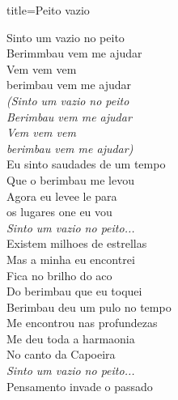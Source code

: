 \documentclass[fontsize=14pt, paper=a4, twoside, DIV=20]{scrreprt} %
\begin{document}
\begin{multicols*}{2}
\begin{song}{title={Peito vazio}}
        \begin{verse*}
            Sinto um vazio no peito\\
            Berimmbau vem me ajudar\\
            Vem vem vem\\
            berimbau vem me ajudar\\
            \textit{(Sinto um vazio no peito}\\
            \textit{Berimbau vem me ajudar}\\
            \textit{Vem vem vem}\\
            \textit{berimbau vem me ajudar)}\\
            Eu sinto saudades de um tempo\\
            Que o berimbau me levou\\
            Agora eu levee le para\\
            os lugares one eu vou\\
            \textit{Sinto um vazio no peito...}\\
            Existem milhoes de estrellas\\
            Mas a minha eu encontrei\\
            Fica no brilho do aco\\
            Do berimbau que eu toquei\\
            Berimbau deu um pulo no tempo\\
            Me encontrou nas profundezas\\
            Me deu toda a harmaonia\\
            No canto da Capoeira\\
            \textit{Sinto um vazio no peito...}\\
            Pensamento invade o passado\\
        \end{verse*}
\end{song}



\end{multicols*}
\end{document}
